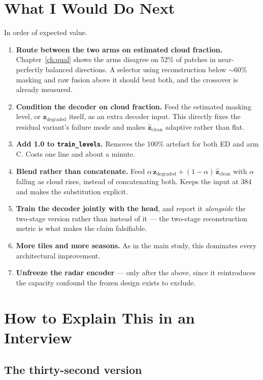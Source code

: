 \documentclass[11pt,a4paper]{report}
\newcommand{\code}[1]{\texttt{\small #1}}
\newcommand{\zd}{\mathbf{z}_{\text{degraded}}}
\newcommand{\zh}{\hat{\mathbf{z}}_{\text{clean}}}
\begin{document}
\chapter{What I Would Do Next}
\label{ch:next}

In order of expected value.

\begin{enumerate}
\item \textbf{Route between the two arms on estimated cloud fraction.}
      Chapter~\ref{ch:qual} shows the arms disagree on 52\% of patches in
      near-perfectly balanced directions. A selector using reconstruction below
      $\sim$60\% masking and raw fusion above it should beat both, and the
      crossover is already measured.
\item \textbf{Condition the decoder on cloud fraction.} Feed the estimated
      masking level, or $\zd$ itself, as an extra decoder input. This directly
      fixes the residual variant's failure mode and makes $\zh$ adaptive rather
      than flat.
\item \textbf{Add 1.0 to \code{train\_levels}.} Removes the 100\% artefact for
      both ED and arm C. Costs one line and about a minute.
\item \textbf{Blend rather than concatenate.} Feed
      $\alpha\,\zd + (1-\alpha)\,\zh$ with $\alpha$ falling as cloud rises,
      instead of concatenating both. Keeps the input at 384 and makes the
      substitution explicit.
\item \textbf{Train the decoder jointly with the head}, and report it
      \emph{alongside} the two-stage version rather than instead of it --- the
      two-stage reconstruction metric is what makes the claim falsifiable.
\item \textbf{More tiles and more seasons.} As in the main study, this dominates
      every architectural improvement.
\item \textbf{Unfreeze the radar encoder} --- only after the above, since it
      reintroduces the capacity confound the frozen design exists to exclude.
\end{enumerate}

\chapter{How to Explain This in an Interview}

\section{The thirty-second version}
\end{document}
